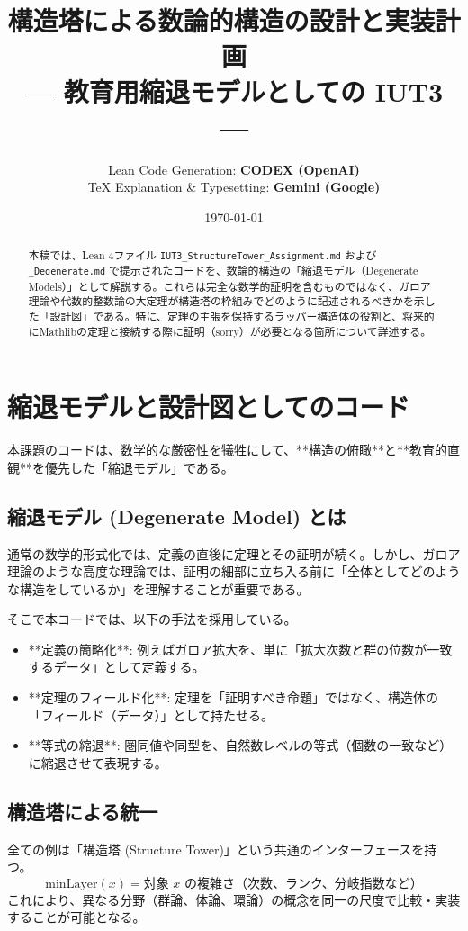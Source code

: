 \documentclass[a4paper,11pt]{ltjsarticle}
\title{\textbf{構造塔による数論的構造の設計と実装計画} \\ \large --- 教育用縮退モデルとしての IUT3 ---}
\author{
    Lean Code Generation: \textbf{CODEX (OpenAI)} \\
    TeX Explanation \& Typesetting: \textbf{Gemini (Google)}
}
\date{\today}
\theoremstyle{definition}
\newcommand{\MinLayer}{\mathrm{minLayer}}
\begin{document}
\maketitle

\begin{abstract}
本稿では、Lean 4ファイル \texttt{IUT3\_StructureTower\_Assignment.md} および \texttt{\_Degenerate.md} で提示されたコードを、数論的構造の「縮退モデル（Degenerate Models）」として解説する。これらは完全な数学的証明を含むものではなく、ガロア理論や代数的整数論の大定理が構造塔の枠組みでどのように記述されるべきかを示した「設計図」である。特に、定理の主張を保持するラッパー構造体の役割と、将来的にMathlibの定理と接続する際に証明（sorry）が必要となる箇所について詳述する。
\end{abstract}

\tableofcontents
\newpage

\section{縮退モデルと設計図としてのコード}

本課題のコードは、数学的な厳密性を犠牲にして、**構造の俯瞰**と**教育的直観**を優先した「縮退モデル」である。

\subsection{縮退モデル (Degenerate Model) とは}
通常の数学的形式化では、定義の直後に定理とその証明が続く。しかし、ガロア理論のような高度な理論では、証明の細部に立ち入る前に「全体としてどのような構造をしているか」を理解することが重要である。

そこで本コードでは、以下の手法を採用している。
\begin{itemize}
    \item **定義の簡略化**: 例えばガロア拡大を、単に「拡大次数と群の位数が一致するデータ」として定義する。
    \item **定理のフィールド化**: 定理を「証明すべき命題」ではなく、構造体の「フィールド（データ）」として持たせる。
    \item **等式の縮退**: 圏同値や同型を、自然数レベルの等式（個数の一致など）に縮退させて表現する。
\end{itemize}

\subsection{構造塔による統一}
全ての例は「構造塔 (Structure Tower)」という共通のインターフェースを持つ。
\[ \MinLayer(x) = \text{対象 } x \text{ の複雑さ（次数、ランク、分岐指数など）} \]
これにより、異なる分野（群論、体論、環論）の概念を同一の尺度で比較・実装することが可能となる。
\end{document}
